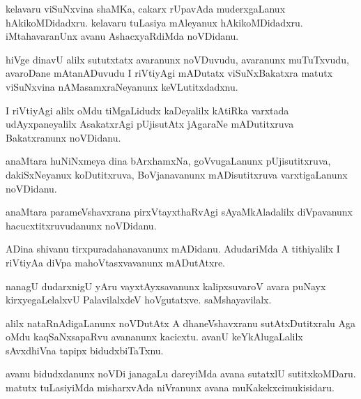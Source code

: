 \documentclass{article}
\begin{document}
\begin{mn}%
kelavaru viSuNxvina shaMKa, cakarx rUpavAda muderxgaLanux hAkikoMDidadxru. kelavaru tuLasiya 
mAleyanux hAkikoMDidadxru. iMtahavaranUnx avanu AshacxyaRdiMda noVDidanu.
\end{mn}

\begin{mn}%
hiVge dinavU alilx sututxtatx avaranunx noVDuvudu, avaranunx muTuTxvudu, avaroDane mAtanADuvudu I 
riVtiyAgi mADutatx viSuNxBakatxra matutx viSuNxvina nAMasamxraNeyanunx keVLutitxdadxnu.
\end{mn}

\begin{mn}%
I riVtiyAgi alilx oMdu tiMgaLidudx kaDeyalilx kAtiRka varxtada udAyxpaneyalilx AsakatxrAgi 
pUjisutAtx jAgaraNe mADutitxruva Bakatxranunx noVDidanu.
\end{mn}

\begin{mn}%
anaMtara huNiNxmeya dina bArxhamxNa, goVvugaLanunx pUjisutitxruva, dakiSxNeyanux koDutitxruva, 
BoVjanavanunx mADisutitxruva varxtigaLanunx noVDidanu.
\end{mn}

\begin{mn}%
anaMtara parameVshavxrana pirxVtayxthaRvAgi sAyaMkAladalilx diVpavanunx hacucxtitxruvudanunx 
noVDidanu.
\end{mn}

\begin{mn}%
ADina shivanu tirxpuradahanavanunx mADidanu. AdudariMda A tithiyalilx I riVtiyAa diVpa 
mahoVtasxvavanunx mADutAtxre.
\end{mn}

\begin{mn}%
nanagU dudarxnigU yAru vayxtAyxsavanunx kalipxsuvaroV avara puNayx kirxyegaLelalxvU PalavilalxdeV 
hoVgutatxve. saMshayavilalx.
\end{mn}

\begin{mn}%
alilx nataRnAdigaLanunx noVDutAtx A dhaneVshavxranu sutAtxDutitxralu Aga oMdu kaqSaNxsapaRvu 
avananunx kacicxtu. avanU keYkAlugaLalilx sAvxdhiVna tapipx bidudxbiTaTxnu.
\end{mn}

\begin{mn}%
avanu bidudxdanunx noVDi janagaLu dareyiMda avana sutatxlU sutitxkoMDaru. matutx tuLasiyiMda 
misharxvAda niVranunx avana muKakekxcimukisidaru.
\end{mn}
\end{document}
